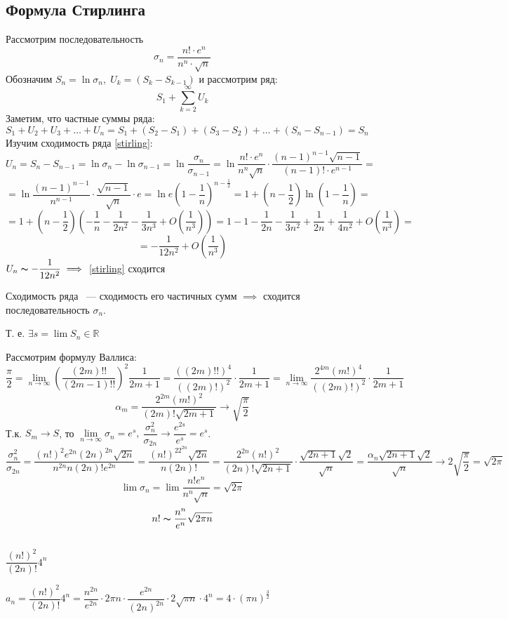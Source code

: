 \documentclass[../../main.tex]{subfiles}
\begin{document}
\subsection{Формула Стирлинга}
Рассмотрим последовательность
\[\sigma_n = \dfrac{n! \cdot e^n}{n^n \cdot \sqrt{n}}\]
Обозначим $ S_n = \ln{\sigma_n},\; U_k = (S_k - S_{k-1})$ и рассмотрим ряд:
\begin{equation}
\label{stirling} S_1 + \sum\limits_{k=2}^\infty U_k
\end{equation}
Заметим, что частные суммы ряда:
\[ 
S_1 + U_2 + U_3 + \ldots + U_n = S_1 + \left(S_2 - S_1\right) + 
\left(S_3 - S_2\right) + \ldots + \left(S_n - S_{n - 1}\right) = S_n
\]
Изучим сходимость ряда \eqref{stirling}:
\[
U_n = S_n - S_{n - 1} = \ln\sigma_n - \ln\sigma_{n - 1} = 
\ln\dfrac{\sigma_n}{\sigma_{n - 1}} = \ln\dfrac{n! \cdot e^n}{n^n\sqrt{n}}
\cdot \dfrac{(n - 1)^{n - 1}\sqrt{n - 1}}{(n - 1)! \cdot e^{n -1}} =
\] 
\[
= \ln\dfrac{(n - 1)^{n - 1}}{n^{n - 1}} \cdot \dfrac{\sqrt{n - 1}}{\sqrt{n}}
\cdot e = \ln e \left(1 - \dfrac{1}{n} \right)^{n - \frac{1}{2}} = 
1 + \left(n - \dfrac{1}{2} \right) \ln \left( 1 - \dfrac{1}{n} \right) =
\]
\[
= 1 + \left( n - \dfrac{1}{2} \right)\left(-\dfrac{1}{n} - \dfrac{1}{2n^2}
- \dfrac{1}{3n^3} + O\left(\dfrac{1}{n^3} \right) \right) = 
1 - 1 - \dfrac{1}{2n} - \dfrac{1}{3n^2} + \dfrac{1}{2n} + \dfrac{1}{4n^2}
+ O\left( \dfrac{1}{n^3} \right) = 
\]
\[= -\dfrac{1}{12n^2} + O\left( \dfrac{1}{n^3}\right)\]
$U_n \thicksim -\dfrac{1}{12n^2} \implies$  \eqref{stirling} сходится

Сходимость ряда ~--- сходимость его частичных сумм $\implies$
сходится последовательность $\sigma_n$.

Т. е. $ \exists s = \lim S_n \in \mathbb{R}$

Рассмотрим формулу Валлиса:
\[
\dfrac{\pi}{2} = \lim\limits_{n \to \infty} \left( \dfrac{(2m)!!}{(2m - 1)!!}
\right)^2 \dfrac{1}{2m + 1} = \dfrac{((2m)!!)^4}{((2m)!)^2} \cdot
\dfrac{1}{2m + 1} = \lim\limits_{n \to \infty} \dfrac{2^{4m}(m!)^4}{((2m)!)^2} 
\cdot \dfrac{1}{2m + 1}
\]
\[
\alpha_m = \dfrac{2^{2m}(m!)^2}{(2m)!\sqrt{2m + 1}} \to \sqrt{\dfrac{\pi}{2}}
\]
Т.к. $ S_m \to S $, то $ \lim\limits_{n \to \infty} \sigma_n = e^s, \ 
\dfrac{\sigma_n^2}{\sigma_{2n}} \to \dfrac{e^{2s}}{e^s} = e^s $.
\[
\dfrac{\sigma_n^2}{\sigma_{2n}} = 
\dfrac{(n!)^2e^{2n}(2n)^{2n}\sqrt{2n}}{n^{2n}n(2n)!e^{2n}} =
\dfrac{(n!)^22^{2n}\sqrt{2n}}{n(2n)!} =
\dfrac{2^{2n}(n!)^2}{(2n)!\sqrt{2n + 1}} \cdot 
\dfrac{\sqrt{2n+1}\sqrt{2}}{\sqrt{n}} = 
\dfrac{\alpha_n\sqrt{2n + 1}\sqrt{2}}{\sqrt{n}} \to
2\sqrt{\dfrac{\pi}{2}} = \sqrt{2\pi}
\]
\[
\lim \sigma_n = \lim \dfrac{n!e^n}{n^n \sqrt{n}} = \sqrt{2\pi}
\]
\[
n! \thicksim \dfrac{n^n}{e^n}\sqrt{2\pi n}
\]
\begin{example}
$ $

$\dfrac{(n!)^2}{(2n)!}4^n$

$a_n = \dfrac{(n!)^2}{(2n)!}4^n = \dfrac{n^{2n}}{e^{2n}} 
\cdot 2\pi n \cdot \dfrac{e^{2n}}{(2n)^{2n}} \cdot 2 \sqrt{\pi n}
\cdot 4^n = 4 \cdot (\pi n)^{\frac{3}{2}}
$
\end{example}
\end{document}
